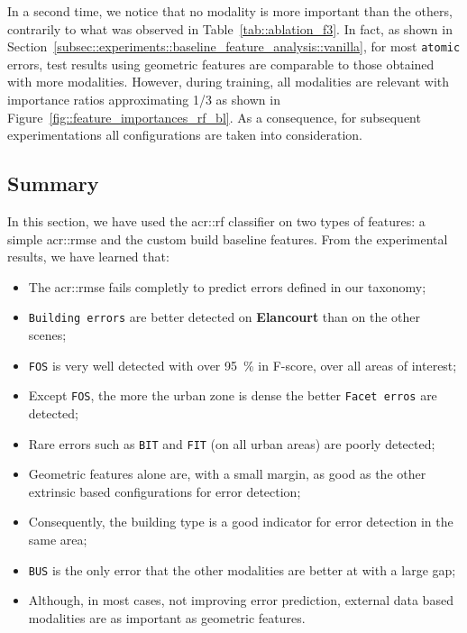         In a second time, we notice that no modality is more important than the others, contrarily to what was observed in Table~\ref{tab::ablation_f3}.
        In fact, as shown in Section~\ref{subsec::experiments::baseline_feature_analysis::vanilla}, for most \texttt{atomic} errors, test results using geometric features are comparable to those obtained with more modalities.
        However, during training, all modalities are relevant with importance ratios approximating \num[fraction-function = \sfrac]{1/3} as shown in Figure~\ref{fig::feature_importances_rf_bl}.
        As a consequence, for subsequent experimentations all configurations are taken into consideration.

    \subsection{Summary}
        \label{subsec::experiments::baseline_feature_analysis::summary}
        In this section, we have used the \gls{acr::rf} classifier on two types of features: a simple \gls{acr::rmse} and the custom build baseline features.
        From the experimental results, we have learned that:
        \begin{itemize}[label=\(\blacktriangleright\)]
            \item The \gls{acr::rmse} fails completly to predict errors defined in our taxonomy;
            \item \texttt{Building errors} are better detected on \textbf{Elancourt} than on the other scenes;
            \item \texttt{FOS} is very well detected with over \SI{95}{\percent} in F-score, over all areas of interest;
            \item Except \texttt{FOS}, the more the urban zone is dense the better \texttt{Facet erros} are detected;
            \item Rare errors such as \texttt{BIT} and \texttt{FIT} (on all urban areas) are poorly detected;
            \item Geometric features alone are, with a small margin, as good as the other extrinsic based configurations for error detection;
            \item Consequently, the building type is a good indicator for error detection in the same area;
            \item \texttt{BUS} is the only error that the other modalities are better at with a large gap;
            \item Although, in most cases, not improving error prediction, external data based modalities are as important as geometric features.
        \end{itemize}

